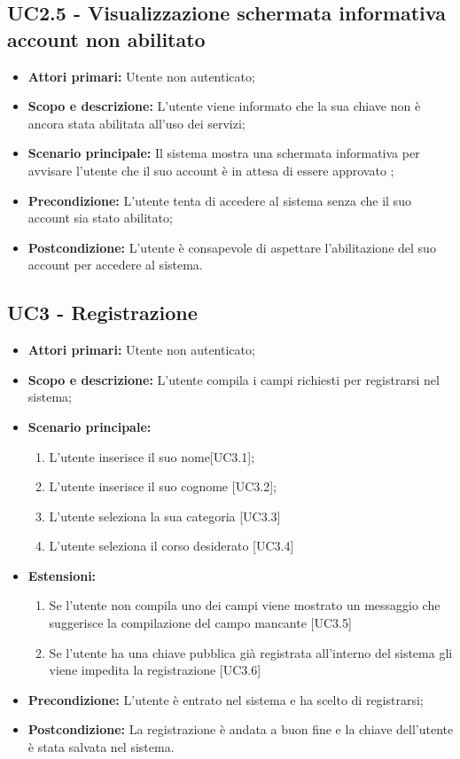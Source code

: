\documentclass[AnalisiDeiRequisiti.tex]{subfiles}
\begin{document}
\subsection{UC2.5 - Visualizzazione schermata informativa account non abilitato}
\begin{itemize}
	\item \textbf{Attori primari:} Utente non autenticato;
	\item \textbf{Scopo e descrizione:} L'utente viene informato che la sua chiave non è ancora stata abilitata all'uso dei servizi;
	\item \textbf{Scenario principale:} Il sistema mostra una schermata informativa per avvisare l'utente che il suo account è in attesa di essere approvato	;
	\item \textbf{Precondizione:} L'utente tenta di accedere al sistema senza che il suo account sia stato abilitato; 
	\item \textbf{Postcondizione:} L'utente è consapevole di aspettare l'abilitazione del suo account per accedere al sistema.
\end{itemize}
\subsection{UC3 - Registrazione}
\begin{itemize}
	\item \textbf{Attori primari:} Utente non autenticato;\\
	\item \textbf{Scopo e descrizione:} L'utente compila i campi richiesti per registrarsi nel sistema;\\
	\item \textbf{Scenario principale:}
	\begin{enumerate}
		\item L'utente inserisce il suo nome[UC3.1];
		\item L'utente inserisce il suo cognome [UC3.2];
		\item L'utente seleziona la sua categoria [UC3.3]
		\item L'utente seleziona il corso desiderato [UC3.4]
	\end{enumerate}
	\item \textbf{Estensioni:}
	\begin{enumerate}
		\item Se l'utente non compila uno dei campi viene mostrato un messaggio che suggerisce la compilazione del campo mancante [UC3.5]
		\item Se l'utente ha una chiave pubblica già registrata  all'interno del sistema gli viene impedita la registrazione [UC3.6]
	\end{enumerate}
	\item \textbf{Precondizione:} L'utente è entrato nel sistema e ha scelto di registrarsi;\\
	\item \textbf{Postcondizione:} La registrazione è andata a buon fine e la chiave dell'utente è stata salvata nel sistema.\\
\end{itemize}
\end{document}
